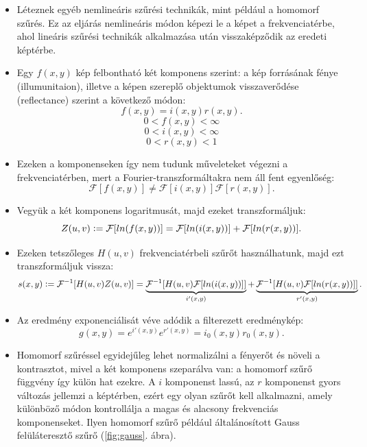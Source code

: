 \documentclass[12pt]{article}
\theoremstyle{plain}
\begin{document}
\begin{itemize}
\item Léteznek egyéb nemlineáris szűrési technikák, mint például a homomorf szűrés. Ez az eljárás nemlineáris módon képezi le a képet a frekvenciatérbe, ahol lineáris szűrési technikák alkalmazása után visszaképződik az eredeti képtérbe.

\item Egy $f(x,y)$ kép felbontható két komponens szerint: a kép forrásának fénye (illumunitaion), illetve a képen szereplő objektumok visszaverődése (reflectance) szerint a következő módon: 
$$f(x,y) = i(x,y)r(x,y).$$
$$0 < f(x,y) < \infty$$
$$0 < i(x,y) < \infty$$
$$0 < r(x,y) < 1$$

\item Ezeken a komponenseken így nem tudunk műveleteket végezni a frekvenciatérben, mert a Fourier-transzformáltakra nem áll fent egyenlőség: $$\mathcal{F}[f(x,y)] \neq \mathcal{F}[i(x,y)]\mathcal{F}[r(x,y)].$$
\item Vegyük a két komponens logaritmusát, majd ezeket transzformáljuk:
$$Z(u,v) \vcentcolon=\mathcal{F}[ln(f(x,y))] =\mathcal{F}[ln(i(x,y))]+\mathcal{F}[ln(r(x,y))].$$
\item Ezeken tetszőleges $H(u,v)$ frekvenciatérbeli szűrőt használhatunk, majd ezt transzformáljuk vissza:
$$s(x,y) \vcentcolon= \mathcal{F}^{-1}[H(u,v)Z(u,v)] =  \underbrace{\mathcal{F}^{-1}[H(u,v)\mathcal{F}[ln(i(x,y))]]}_{i'(x,y)} + \underbrace{\mathcal{F}^{-1}[H(u,v)\mathcal{F}[ln(r(x,y))]]}_{r'(x,y)}.$$
\item Az eredmény exponenciálisát véve adódik a filterezett eredménykép:
$$g(x,y) = e^{i'(x,y)}e^{r'(x,y)} = i_0(x,y)r_0(x,y).$$

\item Homomorf szűréssel egyidejűleg lehet normalizálni a fényerőt és növeli a kontrasztot, mivel a két komponens szeparálva van: a homomorf szűrő függvény így külön hat ezekre. A $i$ komponenst lassú, az $r$ komponenst gyors változás jellemzi a képtérben, ezért egy olyan szűrőt kell alkalmazni, amely különböző módon kontrollálja a magas és alacsony frekvenciás komponenseket. Ilyen homomorf szűrő például általánosított Gauss felüláteresztő szűrő (\ref{fig:gauss}. ábra).


\end{itemize}
\end{document}
